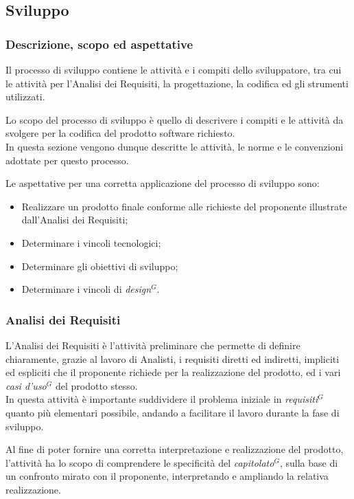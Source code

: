 \nonstopmode
\subsection{Sviluppo}

\subsubsection{Descrizione, scopo ed aspettative}

Il processo di sviluppo contiene le attività e i compiti dello sviluppatore, tra cui le attività per l’Analisi dei Requisiti, la progettazione, la codifica ed gli strumenti utilizzati.

Lo scopo del processo di sviluppo è quello di descrivere i compiti e le attività da svolgere per la codifica del prodotto software richiesto. \\
In questa sezione vengono dunque descritte le attività, le norme e le convenzioni adottate per questo processo.

Le aspettative per una corretta applicazione del processo di sviluppo sono:
\begin{itemize}
    \item Realizzare un prodotto finale conforme alle richieste del proponente illustrate dall'Analisi dei Requisiti;
    \item Determinare i vincoli tecnologici;
    \item Determinare gli obiettivi di sviluppo;
    \item Determinare i vincoli di \emph{design}$^{G}$.
\end{itemize}
\subsubsection{Analisi dei Requisiti}


L’Analisi dei Requisiti è l’attività preliminare che permette di definire chiaramente, grazie al lavoro di Analisti, i requisiti diretti ed indiretti,
impliciti ed espliciti che il proponente richiede per la realizzazione del prodotto, ed i vari \emph{casi d’uso}$^{G}$ del prodotto stesso. \\
In questa attività è importante suddividere il problema iniziale in \emph{requisiti}$^{G}$ quanto più elementari possibile, andando a facilitare il lavoro durante la fase di sviluppo.

Al fine di poter fornire una corretta interpretazione e realizzazione del prodotto, l'attività ha lo scopo di comprendere le specificità del \emph{capitolato}$^{G}$, sulla base di un confronto mirato con il proponente, interpretando e ampliando la relativa realizzazione.
\pagebreak

